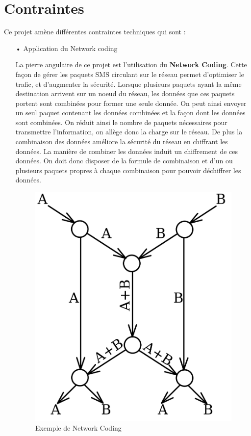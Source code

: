 \section{Contraintes}
Ce projet amène différentes contraintes techniques qui sont :
\\

\begin{itemize}
\item [•]{Application du Network coding}
            
            La pierre angulaire de ce projet est l'utilisation du \textbf{Network Coding}. Cette façon de gérer les paquets SMS circulant sur le réseau permet d'optimiser le trafic, et d'augmenter la sécurité.
            Lorsque plusieurs paquets ayant la même destination arrivent sur un noeud du réseau, les données que ces paquets portent sont combinées pour former une seule donnée. On peut ainsi envoyer un seul paquet contenant les données combinées et la façon dont les données sont combinées.
            On réduit ainsi le nombre de paquets nécessaires pour transmettre l'information, on allège donc la charge sur le réseau.
            De plus la combinaison des données améliore la sécurité du réseau en chiffrant les données. La manière de combiner les données induit un chiffrement de ces données. On doit donc disposer de la formule de combinaison et d'un ou plusieurs paquets propres à chaque combinaison pour pouvoir déchiffrer les données.
            
            \begin{figure}[H]
                \centering
                \includegraphics[scale=0.15]{images/Butterfly_network.svg.png}
                \caption{Exemple de Network Coding}
                \label{fig:exemple_Network_Coding}
            \end{figure}
            

\end{itemize}
